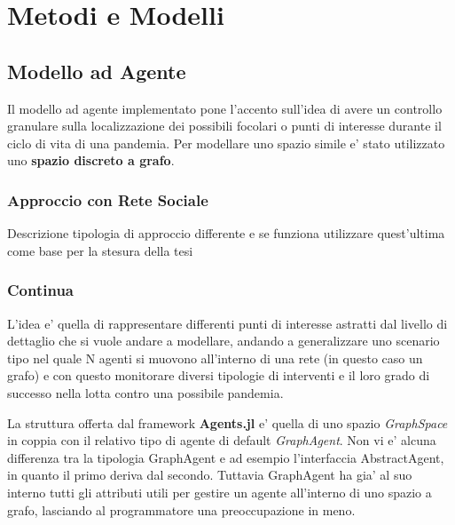 \section{Metodi e Modelli}

\subsection{Modello ad Agente}

Il modello ad agente implementato pone l'accento sull'idea di avere
un controllo granulare sulla localizzazione dei possibili 
focolari o punti di interesse durante il ciclo di vita di una pandemia.
Per modellare uno spazio simile e' stato utilizzato uno \textbf{spazio discreto 
a grafo}. 

\subsubsection*{Approccio con Rete Sociale}
Descrizione tipologia di approccio differente e se funziona
utilizzare quest'ultima come base per la stesura della tesi

\subsubsection*{Continua}

L'idea e' quella di rappresentare differenti punti di interesse astratti dal
livello di dettaglio che si vuole andare a modellare, andando a generalizzare
uno scenario tipo nel quale N agenti si muovono all'interno di una rete 
(in questo caso un grafo) e con questo monitorare diversi tipologie di interventi
e il loro grado di successo nella lotta contro una possibile pandemia.

La struttura offerta dal framework \textbf{Agents.jl} e' quella di uno 
spazio \emph{GraphSpace} in coppia con il relativo tipo di agente di default
\emph{GraphAgent}. Non vi e' alcuna differenza tra la tipologia GraphAgent e 
ad esempio l'interfaccia AbstractAgent, in quanto il primo deriva dal secondo. 
Tuttavia GraphAgent ha gia' al suo interno tutti gli attributi utili per 
gestire un agente all'interno di uno spazio a grafo, lasciando al programmatore una
preoccupazione in meno. 

